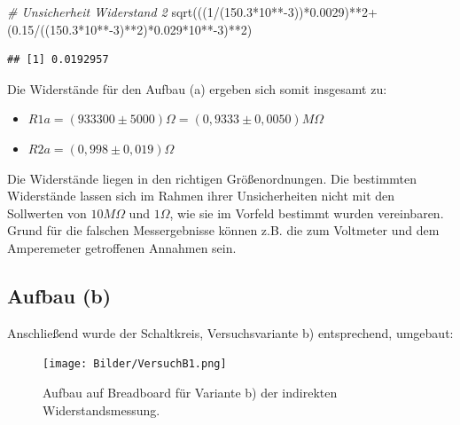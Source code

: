 \documentclass[
  9pt,
]{article}
\newenvironment{Shaded}{\begin{snugshade}}{\end{snugshade}}
\newcommand{\CommentTok}[1]{\textcolor[rgb]{0.56,0.35,0.01}{\textit{#1}}}
\newcommand{\DecValTok}[1]{\textcolor[rgb]{0.00,0.00,0.81}{#1}}
\newcommand{\FloatTok}[1]{\textcolor[rgb]{0.00,0.00,0.81}{#1}}
\newcommand{\FunctionTok}[1]{\textcolor[rgb]{0.00,0.00,0.00}{#1}}
\newcommand{\NormalTok}[1]{#1}
\newcommand{\SpecialCharTok}[1]{\textcolor[rgb]{0.00,0.00,0.00}{#1}}
\begin{document}
\begin{Shaded}
\begin{Highlighting}[]
\CommentTok{\# Unsicherheit Widerstand 2}
\FunctionTok{sqrt}\NormalTok{(((}\DecValTok{1}\SpecialCharTok{/}\NormalTok{(}\FloatTok{150.3}\SpecialCharTok{*}\DecValTok{10}\SpecialCharTok{**{-}}\DecValTok{3}\NormalTok{))}\SpecialCharTok{*}\FloatTok{0.0029}\NormalTok{)}\SpecialCharTok{**}\DecValTok{2}\SpecialCharTok{+}\NormalTok{(}\FloatTok{0.15}\SpecialCharTok{/}\NormalTok{((}\FloatTok{150.3}\SpecialCharTok{*}\DecValTok{10}\SpecialCharTok{**{-}}\DecValTok{3}\NormalTok{)}\SpecialCharTok{**}\DecValTok{2}\NormalTok{)}\SpecialCharTok{*}\FloatTok{0.029}\SpecialCharTok{*}\DecValTok{10}\SpecialCharTok{**{-}}\DecValTok{3}\NormalTok{)}\SpecialCharTok{**}\DecValTok{2}\NormalTok{)}
\end{Highlighting}
\end{Shaded}

\begin{verbatim}
## [1] 0.0192957
\end{verbatim}

Die Widerstände für den Aufbau (a) ergeben sich somit insgesamt zu:

\begin{itemize}
\item $R1a = (933300 \pm 5000)\Omega = (0,9333 \pm 0,0050)M\Omega$
\item $R2a = (0,998 \pm 0,019) \Omega$
\end{itemize}

Die Widerstände liegen in den richtigen Größenordnungen. Die bestimmten
Widerstände lassen sich im Rahmen ihrer Unsicherheiten nicht mit den
Sollwerten von \(10M\Omega\) und \(1\Omega\), wie sie im Vorfeld
bestimmt wurden vereinbaren. Grund für die falschen Messergebnisse
können z.B. die zum Voltmeter und dem Amperemeter getroffenen Annahmen
sein.

\hypertarget{aufbau-b}{%
\subsection{Aufbau (b)}\label{aufbau-b}}

Anschließend wurde der Schaltkreis, Versuchsvariante b) entsprechend,
umgebaut:

\begin{figure}
\centering
\texttt{[image: Bilder/VersuchB1.png]}
\caption{Aufbau auf Breadboard für Variante b) der indirekten
Widerstandsmessung.}
\end{figure}
\end{document}

